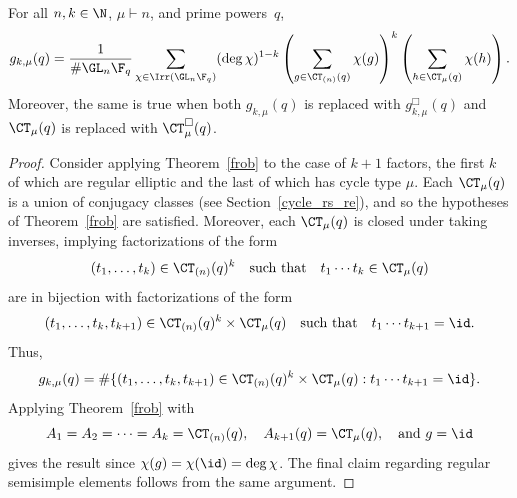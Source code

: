 \begin{corollary}
\label{ff_in_situ_corollary}
For all \(n,k \in \N\), \(\mu \vdash n\), and prime powers~\(q\),
\begin{equation}
g_{k,\mu} (q)
=
\label{ff_in_situ}
\frac{1}{\# \GL_n \F_q}
\sum_{\chi \in \Irr (\GL_n \F_q)}
(\deg \chi)^{1-k}
\left ( \sum_{g \in \CT_{(n)} (q)} \chi(g) \right )^k
\left ( \sum_{h \in \CT_\mu (q)}   \chi(h) \right ).
\end{equation}
Moreover, the same is true when both \(g_{k,\mu} (q)\) is replaced with \(g_{k,\mu}^\Box (q)\) and \(\CT_\mu (q)\) is replaced with \(\CT_\mu^\Box (q)\).
\end{corollary}

\begin{proof}
Consider applying Theorem~\ref{frob} to the case of \(k+1\) factors, the first \(k\) of which are regular elliptic and the last of which has cycle type \(\mu\).
Each \(\CT_\mu (q)\) is a union of conjugacy classes (see Section~\ref{cycle_rs_re}), and so the hypotheses of Theorem~\ref{frob} are satisfied.
Moreover, each \(\CT_\mu (q)\) is closed under taking inverses, implying factorizations of the form
\[
(t_1,\ldots,t_k) \in \CT_{(n)}(q)^k
\quad
\text{such that}
\quad
t_1 \cdots t_k \in \CT_\mu (q)
\]
are in bijection with factorizations of the form
\[
(t_1,\ldots,t_k,t_{k+1}) \in \CT_{(n)}(q)^k \times \CT_\mu (q)
\quad
\text{such that}
\quad
t_1 \cdots t_{k+1} = \id.
\]
Thus,
\[
g_{k,\mu} (q)
=
\# \{ (t_1,\ldots,t_k,t_{k+1}) \in \CT_{(n)} (q)^k \times \CT_\mu (q) : t_1 \cdots t_{k+1} = \id \}.
\]
Applying Theorem~\ref{frob} with
\[
A_1 = A_2 = \cdots = A_k = \CT_{(n)}(q), \quad A_{k+1} (q) = \CT_\mu (q), \quad \text{and } g = \id
\]
gives the result
since \(\chi(g) = \chi(\id) = \deg \chi\).
The final claim regarding regular semisimple elements follows from the same argument.
\end{proof}


































